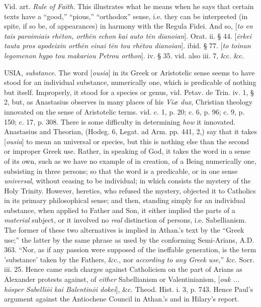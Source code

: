 Vid. art. \emph{Rule of Faith}. This illustrates
what he means when he says that certain texts have a ``good,'' ``pious,'' ``orthodox''
sense, i.e. they can be interpreted (in spite, if so be, of
appearances) in harmony with the Regula Fidei. And so, [\emph{to en tais
paroimiais rh\={e}ton, orth\={e}n echon kai auto t\={e}n
dianoian}]. Orat. ii. § 44. [\emph{\={e}rkei tauta pros apodeixin
orth\={e}n einai t\={e}n tou rh\={e}tou dianoian}]. ibid.
§ 77. [\emph{to toinun legomenon hypo tou makariou Petrou orthon}].
iv. § 35. vid. also iii. 7, \&c. \&c.

\xsection{[Ousia, on]}

USIA,
\emph{substance}. The word [\emph{ousia}] in its Greek or Aristotelic
sense seems to have stood for an individual substance, numerically
one, which is predicable of nothing but itself. Improperly, it stood
for a species or genus, vid. Petav. de Trin. iv. 1, § 2, but, as
Anastasius observes in many places of his \emph{Viæ dux}, Christian
theology innovated on the sense of Aristotelic terms. vid. c. 1, p.
20; c. 6, p. 96; c. 9, p. 150; c. 17, p. 308. There is some difficulty
in determining \emph{how} it innovated. Anastasius and Theorian, (Hodeg.
6, Legat. ad Arm. pp. 441, 2,) say that it takes [\emph{ousia}] to
mean an universal or species, but this is nothing else than the second
or improper Greek use. Rather, in speaking of God, it takes the word
in a sense of its own, such as we have no example of in creation, of a
Being numerically one, subsisting in three persons; so that the word
is a predicable, or in one sense \emph{universal}, without ceasing to
be individual; in which consists the mystery of the Holy Trinity.
However, heretics, who refused the mystery, objected it to Catholics
in its primary philosophical sense; and then, standing simply for an
individual substance, when applied to Father and Son, it either
implied the parts of a \emph{material} subject, or it involved no \emph{real}
distinction of persons, i.e. Sabellianism. The former of these two
alternatives is implied in Athan.'s text by the ``Greek use;'' the
latter by the same phrase as used by the conforming Semi-Arians,
A.D.
363. ``Nor, as if any passion were supposed of the ineffable
generation, is the term 'substance' taken by the Fathers, \&c., nor
\emph{according to any Greek use},'' \&c. Socr. iii. 25. Hence came
such charges against Catholicism on the part of Arians as Alexander
protests against, of \emph{either} Sabellianism or Valentinianism, [\emph{ouk
... h\={o}sper Sabelli\={o}i kai Balentin\={o}i dokei}],
\&c. Theod. Hist. i. 3, p. 743. Hence Paul's argument against the
Antiochene Council in Athan.'s and in Hilary's report.

